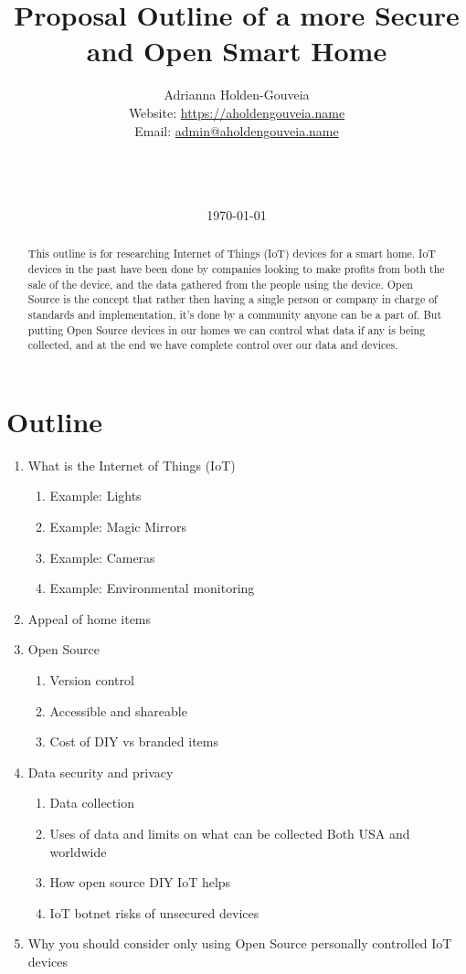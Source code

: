 \documentclass[12pt]{article}
\title{Proposal Outline of a more Secure and Open Smart Home}
\author{
        Adrianna Holden-Gouveia \\
        Website: \url{https://aholdengouveia.name}\\ 
        Email: \href{mailto:admin@aholdengouveia.name}{admin@aholdengouveia.name} \\
        \faLinkedin{: aholdengouveia} \\
        \faGithub {: aholdengouveia} \\
        \faTwitter {: aholdengouveia} \\
        }
\date{\today}
\begin{document}
    

\maketitle

\begin{abstract}
This outline is for researching Internet of Things (IoT) devices for a smart home. IoT devices in the past have been done by companies looking to make profits from both the sale of the device, and the data gathered from the people using the device.  Open Source is the concept that rather then having a single person or company in charge of standards and implementation, it's done by a community anyone can be a part of.  But putting Open Source devices in our homes we can control what data if any is being collected, and at the end we have complete control over our data and devices.
\end{abstract}


\section*{Outline}

\begin{enumerate}
    \item What is the Internet of Things (IoT)
    \begin{enumerate}
        \item Example: Lights
        \item Example: Magic Mirrors
        \item Example: Cameras
        \item Example: Environmental monitoring
    \end{enumerate}
    \item Appeal of home items 
    \item Open Source
    \begin{enumerate}
        \item Version control
        \item Accessible and shareable
        \item Cost of DIY vs branded items
    \end{enumerate}
    \item Data security and privacy
    \begin{enumerate}
        \item Data collection
        \item Uses of data and limits on what can be collected Both USA and worldwide
        \item How open source DIY IoT helps
        \item IoT botnet risks of unsecured devices
    \end{enumerate}
    \item Why you should consider only using Open Source personally controlled IoT devices
\end{enumerate}
\end{document}
